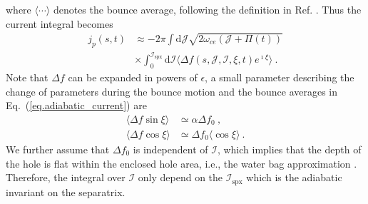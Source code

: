 where $\langle\cdots\rangle$ denotes the bounce average, following the definition in Ref. \cite{berk1999}.
Thus the current integral becomes
\begin{equation}\label{eq.adiabatic_current}
\begin{aligned}
    j_p(s,t)  &\approx -  {2\pi} \int\mathrm{d} \mathcal{J}  \sqrt{2\omega_{ce} (\mathcal{J} + \Pi(t))} \\
    & \times 
    \int_0^{\mathcal{I}_{\mathrm{s p x}}}\mathrm{d}\mathcal{I}  \langle \Delta f(s,\mathcal{J},\mathcal{I},\xi,t)e^{\imath \xi} \rangle  ~.
\end{aligned}
\end{equation}
Note that $\Delta f$ can be expanded in powers of $\epsilon$, a small parameter describing the change of parameters during the bounce motion
and the bounce averages in Eq.~(\ref{eq.adiabatic_current}) are 
 \cite{berk1999} 
\begin{equation}
    \begin{aligned}
    \langle\Delta f \sin \xi \rangle &\simeq \alpha \Delta f_0 ~, \\ 
    \langle \Delta f \cos \xi \rangle &\simeq  \Delta f_0 \langle \cos \xi \rangle ~.
    \end{aligned}
\end{equation}
We further assume that $\Delta f_0$ is independent of $\mathcal{I}$, which implies that the depth of the hole is flat within the enclosed hole area, i.e., the water bag approximation \cite{omura_theory_2008,hezaveh2021}. 
Therefore, the integral over $\mathcal{I}$ only depend on the $\mathcal{I}_\mathrm{spx}$ which is the 
 adiabatic invariant on the separatrix. 
